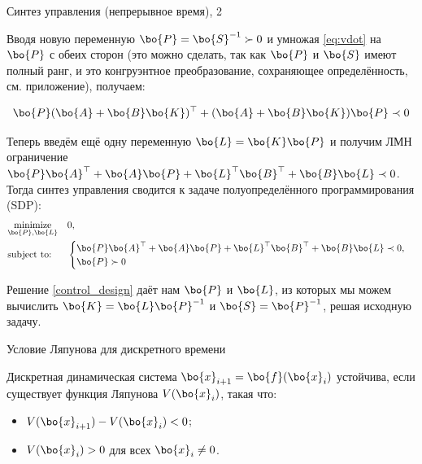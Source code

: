 \documentclass{beamer}
\begin{document}
\begin{frame}{Синтез управления (непрерывное время), 2}
	\begin{flushleft}
		
		Вводя новую переменную $\bo{P} = \bo{S}^{-1} \succ 0$ и умножая \eqref{eq:vdot} на $\bo{P}$ с обеих сторон (это можно сделать, так как $\bo{P}$ и $\bo{S}$ имеют полный ранг, и это конгруэнтное преобразование, сохраняющее определённость, см. приложение), получаем:
		
		\begin{equation}
			\bo{P}(\bo{A} + \bo{B}\bo{K})^\top + (\bo{A} + \bo{B}\bo{K})\bo{P} \prec 0
		\end{equation}
		
		Теперь введём ещё одну переменную $\bo{L} = \bo{K}\bo{P}$ и получим ЛМН ограничение $\bo{P}\bo{A}^\top + \bo{A}\bo{P} + \bo{L}^\top\bo{B}^\top + \bo{B}\bo{L} \prec 0$. Тогда синтез управления сводится к задаче полуопределённого программирования (SDP):
		\begin{equation}
			\label{control_design}
			\begin{aligned}
				& \underset{\bo{P}, \bo{L}}{\text{minimize}} 
				& &  0, \\
				& \text{subject to:} & & 
				\begin{cases}
					\bo{P}\bo{A}^\top + \bo{A}\bo{P} + \bo{L}^\top\bo{B}^\top + \bo{B}\bo{L} \prec 0, \\ 
					\bo{P} \succ 0
				\end{cases}
			\end{aligned}
		\end{equation}
		
		Решение \eqref{control_design} даёт нам $\bo{P}$ и $\bo{L}$, из которых мы можем вычислить $\bo{K} = \bo{L}\bo{P}^{-1}$ и $\bo{S} = \bo{P}^{-1}$, решая исходную задачу.
		
	\end{flushleft}
\end{frame}

\begin{frame}{Условие Ляпунова для дискретного времени}
	\begin{flushleft}
		
		Дискретная динамическая система $\bo{x}_{i+1} = \bo{f}(\bo{x}_i)$ устойчива, если существует функция Ляпунова $V(\bo{x}_i)$, такая что:
		
		\begin{itemize}
			\item $V(\bo{x}_{i+1}) - V(\bo{x}_i) < 0$;
			\item $V(\bo{x}_i) > 0$ для всех $\bo{x}_i \neq 0$.
		\end{itemize}
		
	\end{flushleft}
\end{frame}
\end{document}
